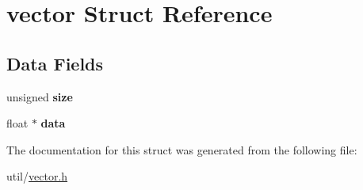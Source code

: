 \hypertarget{structvector}{}\section{vector Struct Reference}
\label{structvector}
\subsection*{Data Fields}
\begin{DoxyCompactItemize}
\item 
\mbox{\label{structvector_aca6d41fa0791981e3d76e6c2c4da7f5b}} 
unsigned {\bfseries size}
\item 
\mbox{\label{structvector_a7425cdf0642c0e45759b4e46772ff1b5}} 
float $\ast$ {\bfseries data}
\end{DoxyCompactItemize}


The documentation for this struct was generated from the following file\+:\begin{DoxyCompactItemize}
\item 
util/\hyperlink{vector_8h}{vector.\+h}\end{DoxyCompactItemize}
